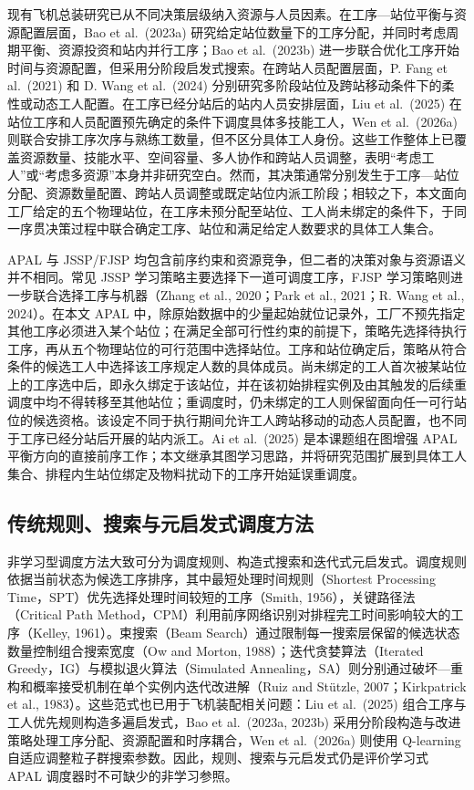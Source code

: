 \documentclass[journal,10pt]{IEEEtran}
\begin{document}
现有飞机总装研究已从不同决策层级纳入资源与人员因素。在工序---站位平衡与资源配置层面，Bao et al.~(2023a) 研究给定站位数量下的工序分配，并同时考虑周期平衡、资源投资和站内并行工序；Bao et al.~(2023b) 进一步联合优化工序开始时间与资源配置，但采用分阶段启发式搜索。在跨站人员配置层面，P. Fang et al.~(2021) 和 D. Wang et al.~(2024) 分别研究多阶段站位及跨站移动条件下的柔性或动态工人配置。在工序已经分站后的站内人员安排层面，Liu et al.~(2025) 在站位工序和人员配置预先确定的条件下调度具体多技能工人，Wen et al.~(2026a) 则联合安排工序次序与熟练工数量，但不区分具体工人身份。这些工作整体上已覆盖资源数量、技能水平、空间容量、多人协作和跨站人员调整，表明``考虑工人''或``考虑多资源''本身并非研究空白。然而，其决策通常分别发生于工序---站位分配、资源数量配置、跨站人员调整或既定站位内派工阶段；相较之下，本文面向工厂给定的五个物理站位，在工序未预分配至站位、工人尚未绑定的条件下，于同一序贯决策过程中联合确定工序、站位和满足给定人数要求的具体工人集合。

APAL 与 JSSP/FJSP 均包含前序约束和资源竞争，但二者的决策对象与资源语义并不相同。常见 JSSP 学习策略主要选择下一道可调度工序，FJSP 学习策略则进一步联合选择工序与机器（Zhang et al., 2020；Park et al., 2021；R. Wang et al., 2024）。在本文 APAL 中，除原始数据中的少量起始就位记录外，工厂不预先指定其他工序必须进入某个站位；在满足全部可行性约束的前提下，策略先选择待执行工序，再从五个物理站位的可行范围中选择站位。工序和站位确定后，策略从符合条件的候选工人中选择该工序规定人数的具体成员。尚未绑定的工人首次被某站位上的工序选中后，即永久绑定于该站位，并在该初始排程实例及由其触发的后续重调度中均不得转移至其他站位；重调度时，仍未绑定的工人则保留面向任一可行站位的候选资格。该设定不同于执行期间允许工人跨站移动的动态人员配置，也不同于工序已经分站后开展的站内派工。Ai et al.~(2025) 是本课题组在图增强 APAL 平衡方向的直接前序工作；本文继承其图学习思路，并将研究范围扩展到具体工人集合、排程内生站位绑定及物料扰动下的工序开始延误重调度。

\subsection{传统规则、搜索与元启发式调度方法}\label{ux4f20ux7edfux89c4ux5219ux641cux7d22ux4e0eux5143ux542fux53d1ux5f0fux8c03ux5ea6ux65b9ux6cd5}

非学习型调度方法大致可分为调度规则、构造式搜索和迭代式元启发式。调度规则依据当前状态为候选工序排序，其中最短处理时间规则（Shortest Processing Time，SPT）优先选择处理时间较短的工序（Smith, 1956），关键路径法（Critical Path Method，CPM）利用前序网络识别对排程完工时间影响较大的工序（Kelley, 1961）。束搜索（Beam Search）通过限制每一搜索层保留的候选状态数量控制组合搜索宽度（Ow and Morton, 1988）；迭代贪婪算法（Iterated Greedy，IG）与模拟退火算法（Simulated Annealing，SA）则分别通过破坏---重构和概率接受机制在单个实例内迭代改进解（Ruiz and Stützle, 2007；Kirkpatrick et al., 1983）。这些范式也已用于飞机装配相关问题：Liu et al.~(2025) 组合工序与工人优先规则构造多遍启发式，Bao et al.~(2023a, 2023b) 采用分阶段构造与改进策略处理工序分配、资源配置和时序耦合，Wen et al.~(2026a) 则使用 Q-learning 自适应调整粒子群搜索参数。因此，规则、搜索与元启发式仍是评价学习式 APAL 调度器时不可缺少的非学习参照。
\end{document}
